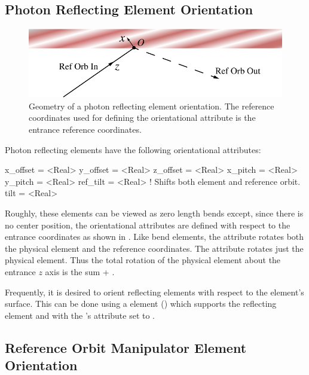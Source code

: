 \subsection{Photon Reflecting Element Orientation}
\label{s:photon.orient}

\begin{figure}[ht]
  \centering
  \includegraphics{reflect-orient.pdf}
  \caption[Geometry of a photon reflecting element orientation]{
Geometry of a photon reflecting element orientation.  The reference coordinates used for defining
the orientational attribute is the entrance reference coordinates.  }
  \label{f:reflect.orient}
\end{figure}

Photon reflecting elements have the following orientational attributes:
\begin{example}
  x_offset = <Real>
  y_offset = <Real>
  z_offset = <Real>
  x_pitch  = <Real>
  y_pitch  = <Real>
  ref_tilt = <Real>    ! Shifts both element and reference orbit.
  tilt     = <Real>    
\end{example}
Roughly, these elements can be viewed as zero length bends except, since there is no center
position, the orientational attributes are defined with respect to the entrance coordinates as shown
in . Like bend elements, the  attribute rotates both the physical
element and the reference coordinates.  The  attribute rotates just the physical
element. Thus the total rotation of the physical element about the entrance $z$ axis is the sum
 + .

Frequently, it is desired to orient reflecting elements with respect to the element's surface. This
can be done using a  element () which supports the reflecting element and
with the 's  attribute set to .

\subsection{Reference Orbit Manipulator Element Orientation}
\label{s:manip.orient}

